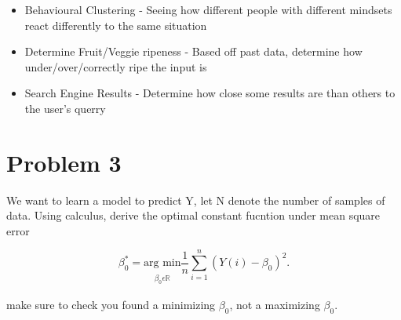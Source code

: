 \documentclass[11pt]{article}
\begin{document}
\begin{enumerate}[label=(\alph*)]
          \begin{itemize}
              \item Behavioural Clustering - Seeing how different people with different mindsets react differently to the same situation
              \item Determine Fruit/Veggie ripeness - Based off past data, determine how under/over/correctly ripe the input is
              \item Search Engine Results - Determine how close some results are than others to the user's querry
          \end{itemize}
\end{enumerate}


\pagebreak
\section{Problem 3}
We want to learn a model to predict Y, let N denote the number of samples of data. Using calculus, derive the optimal constant fucntion under mean square error
\begin{center}
    \[
        \beta_{0}^{*} = \underset{\substack{\\ \beta_{0} \epsilon \mathbb{R} } } {\text{arg min} } \frac{1}{n} \sum_{i = 1}^{n}(Y(i) - \beta_{0})^{2} \text{.}
    \]
\end{center}
make sure to check you found a minimizing $\beta_{0}$, not a maximizing $\beta_{0}$.\\



\end{document}
